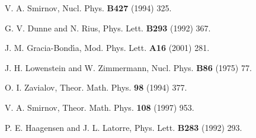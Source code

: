 \documentclass[a4paper,12pt]{article}
\newcommand{\7}{\dagger}           %
\theoremstyle{plain}
\theoremstyle{definition}
\begin{document}
\begin{thebibliography}{53}
V. A. Smirnov,
Nucl. Phys. {\bf B427} (1994) 325.

 G. V. Dunne and N. Rius,
Phys. Lett. {\bf B293} (1992) 367.

J. M. Gracia-Bond\'{\i}a,
Mod. Phys. Lett. {\bf A16} (2001) 281.

J. H. Lowenstein and W. Zimmermann,
Nucl. Phys. {\bf B86} (1975) 77.

O. I. Zavialov,
Theor. Math. Phys. {\bf 98} (1994) 377.

V. A. Smirnov,
Theor. Math. Phys. {\bf 108} (1997) 953.

P. E. Haagensen and J. L. Latorre,
Phys. Lett. {\bf B283} (1992) 293.

\end{thebibliography}
\end{document}
